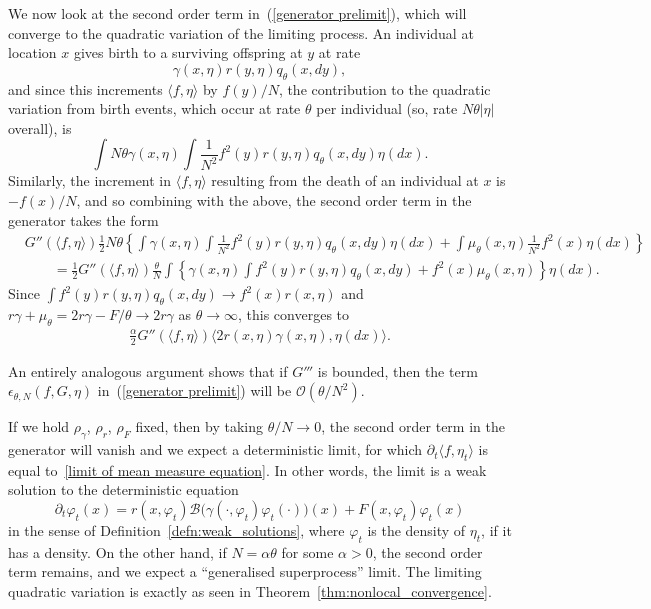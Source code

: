 \documentclass[EJP]{ejpecp} %
\newcommand{\bigO}{\mathcal{O}}
\newcommand{\DG}{\mathcal{B}}  %
\begin{document}
We now look at the second order term in~(\ref{generator prelimit}),
which will converge to the quadratic variation of the limiting process.
An individual at location $x$ gives birth 
to a surviving offspring at $y$ at rate
$$
\gamma(x,\eta) r(y,\eta) q_{\theta}(x, dy) ,
$$
and since this increments $\langle f, \eta \rangle$ by $f(y) / N$,
the contribution to the quadratic variation from birth events,
which occur at rate $\theta$ per individual 
(so, rate $N\theta |\eta|$ overall), is
$$
\int
    N \theta \gamma(x,\eta)
    \int \frac{1}{N^2} f^2(y) r(y,\eta)
    q_\theta(x,dy) 
\eta(dx) .
$$
Similarly, the increment in $\langle f, \eta\rangle$ resulting from 
the death of an individual at $x$ is $-f(x)/N$, and so combining with the 
above, the second order term in the generator takes the form
\begin{align*}
& G''(\langle f,\eta\rangle)
\frac{1}{2} N \theta
\left\{
    \int
        \gamma(x,\eta)
        \int \frac{1}{N^2}f^2(y)r(y,\eta)q_\theta(x,dy) 
    \eta(dx)
    +
    \int
        \mu_\theta(x,\eta)\frac{1}{N^2}f^2(x) 
    \eta(dx)
\right\} \\
&\qquad
= \frac{1}{2} G''(\langle f, \eta \rangle)
    \frac{\theta}{N}
	\int\left\{
		\gamma(x, \eta) \int f^2(y) r(y, \eta) q_\theta(x, dy) + f^2(x) \mu_\theta(x, \eta)
    \right\} \eta(dx) .
\end{align*}
Since $\int f^2(y) r(y, \eta) q_\theta(x, dy) \to f^2(x) r(x, \eta)$
and $r\gamma  + \mu_\theta = 2 r \gamma  - F / \theta \to 2 r \gamma$
as $\theta \to \infty$,
this converges to
\begin{align*}
\frac{\alpha}{2} G''(\langle f, \eta \rangle)
    \big\langle
	2 r(x, \eta) \gamma(x, \eta),
        \eta(dx)
    \big\rangle .
\end{align*}

An entirely analogous argument shows that if $G'''$ is bounded, then
the term $\epsilon_{\theta,N}(f, G, \eta)$ 
in~(\ref{generator prelimit}) will be $\bigO(\theta/N^2)$. 

If we hold $\rho_\gamma$, $\rho_r$, $\rho_F$ fixed, then 
by taking $\theta/N \rightarrow 0$, the second order term in the generator 
will vanish and we expect a deterministic limit,
for which $\partial_t \langle f, \eta_t \rangle$ is equal to~\eqref{limit of mean measure equation}.
In other words, the limit is a weak solution to the deterministic equation
\begin{equation}
\label{deterministic limit}
\partial_t\varphi_t(x)
=
    r(x,\varphi_t)
    \DG\big(
        \gamma(\cdot,\varphi_t) \varphi_t(\cdot)
    \big)(x)
    + F(x, \varphi_t) \varphi_t(x) 
\end{equation}
in the sense of Definition~\ref{defn:weak_solutions},
where $\varphi_t$ is the density of $\eta_t$, if it has a density.
On the other hand, if $N = \alpha \theta$ for some $\alpha > 0$,
the second order term remains, and we expect a ``generalised superprocess'' limit.
The limiting quadratic variation
is exactly as seen in Theorem~\ref{thm:nonlocal_convergence}.
\end{document}
